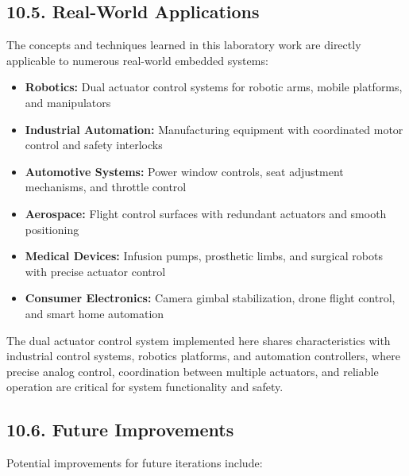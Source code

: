 \documentclass[12pt]{article}
\begin{document}
\subsection*{10.5. Real-World Applications}

The concepts and techniques learned in this laboratory work are directly applicable to numerous real-world embedded systems:

\begin{itemize}
    \item \textbf{Robotics:} Dual actuator control systems for robotic arms, mobile platforms, and manipulators
    \item \textbf{Industrial Automation:} Manufacturing equipment with coordinated motor control and safety interlocks
    \item \textbf{Automotive Systems:} Power window controls, seat adjustment mechanisms, and throttle control
    \item \textbf{Aerospace:} Flight control surfaces with redundant actuators and smooth positioning
    \item \textbf{Medical Devices:} Infusion pumps, prosthetic limbs, and surgical robots with precise actuator control
    \item \textbf{Consumer Electronics:} Camera gimbal stabilization, drone flight control, and smart home automation
\end{itemize}

The dual actuator control system implemented here shares characteristics with industrial control systems, robotics platforms, and automation controllers, where precise analog control, coordination between multiple actuators, and reliable operation are critical for system functionality and safety.

\subsection*{10.6. Future Improvements}

Potential improvements for future iterations include:
\end{document}
